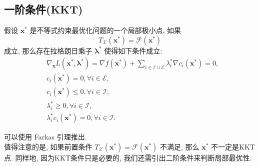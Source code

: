 \documentclass[lang = cn]{elegantpaper}
\begin{document}
\subsection{一阶条件(KKT)}
\begin{theorem}
    假设 $\bm{x}^{*}$ 是不等式约束最优化问题的一个局部极小点, 如果
\begin{equation*}
    T_\mathcal{X}(\bm{x}^{*}) = \mathcal{F}(\bm{x}^{*})
\end{equation*}
    成立, 那么存在拉格朗日乘子 $\bm{\lambda}^{*}$ 使得如下条件成立:
\begin{equation*}
\begin{aligned}
    &\nabla_{\bm{x}}L(\bm{x}^{*},\bm{\lambda}^{*}) = \nabla f(\bm{x}^{*}) + \sum_{i \in \mathcal{I} \cup \mathcal{E}} \lambda_i^{*} \nabla c_i(\bm{x}^{*}) = 0,\\
    &c_i(\bm{x}^{*}) = 0, \forall i \in \mathcal{E},\\
    &c_i(\bm{x}^{*}) \le 0, \forall i \in \mathcal{I},\\
    &\lambda_i^{*} \ge 0, \forall i \in \mathcal{I},\\
    &\lambda_i^{*}c_i(\bm{x}^{*}) = 0, \forall i \in \mathcal{I}.
\end{aligned}
\end{equation*}
\end{theorem}
\noindent
可以使用 Farkas 引理推出.\\
值得注意的是, 如果前置条件 $T_\mathcal{X}(\bm{x}^{*}) = \mathcal{F}(\bm{x}^{*})$ 不满足, 那么 $\bm{x}^{*}$ 不一定是KKT点. 同样地, 因为KKT条件只是必要的, 我们还需引出二阶条件来判断局部最优性.
\end{document}

